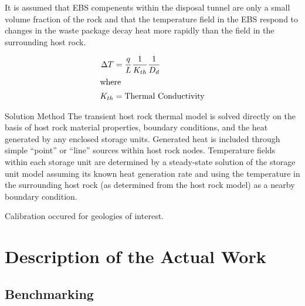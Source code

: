 \documentclass{anstrans}
\begin{document}









It is assumed that \gls{EBS} compenents within the disposal tunnel are only a 
small volume fraction of the rock and that the temperature field in the \gls{EBS} 
respond to changes in the waste package decay heat more rapidly than the field 
in the surrounding host rock.

\begin{align}
  \Delta T &= \frac{q}{L} \frac{1}{K_{th}}\frac{1}{D_d}\\
  \intertext{where}
  K_{th} &= \mbox{Thermal Conductivity}
  \label{deltat}
\end{align}







Solution Method
The transient host rock thermal model is solved directly on the basis of host 
rock material properties, boundary conditions, and the heat generated by any 
enclosed storage units. Generated heat is included through simple “point” or 
“line” sources within host rock nodes.  Temperature fields within each storage 
unit are determined by a steady-state solution of the storage unit model 
assuming its known heat generation rate and using the temperature in the 
surrounding host rock (as determined from the host rock model) as a nearby 
boundary condition. 

Calibration occured for geologies of interest.  




\section{Description of the Actual Work}

\subsection{Benchmarking}
\end{document}
